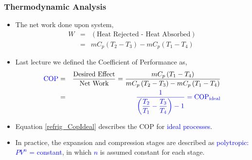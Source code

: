 \documentclass[10pt,compress]{beamer}
\newcommand{\frc}{\displaystyle\frac}
\begin{document}
\begin{frame}
 \frametitle{Thermodynamic Analysis}
    \begin{itemize}
     \item <1-> The net work done upon system,
      \begin{eqnarray}
       W &=& \left(\text{Heat Rejected - Heat Absorbed}\right) \nonumber \\
         &=& mC_{p}\left(T_{2}-T_{3}\right) - mC_{p}\left(T_{1}-T_{4}\right)
      \end{eqnarray}
     \item <2-> Last lecture we defined the Coefficient of Performance as,
      \begin{eqnarray}
       \textcolor{blue}{\text{COP}} &=& \frc{\text{Desired Effect}}{\text{Net Work}} = \frc{mC_{p}\left(T_{1}-T_{4}\right)}{mC_{p}\left(T_{2}-T_{3}\right) - mC_{p}\left(T_{1}-T_{4}\right)} \nonumber \\
                  &=& \textcolor{blue}{\frc{1}{\left(\frc{T_{2}}{T_{1}}-\frc{T_{3}}{T_{4}}\right)-1} = \text{COP}_{\text{ideal}}}\label{refrig_CopIdeal}
      \end{eqnarray}
     \item <3-> Equation \ref{refrig_CopIdeal} describes the COP for \textcolor{blue}{ideal processes}. 
     \item <4-> In practice, the expansion and compression stages are described as \textcolor{blue}{polytropic: $PV^{n}$ = constant}, in which \textcolor{blue}{$n$} is assumed constant for each stage.
    \end{itemize}


\end{frame}
\end{document}
